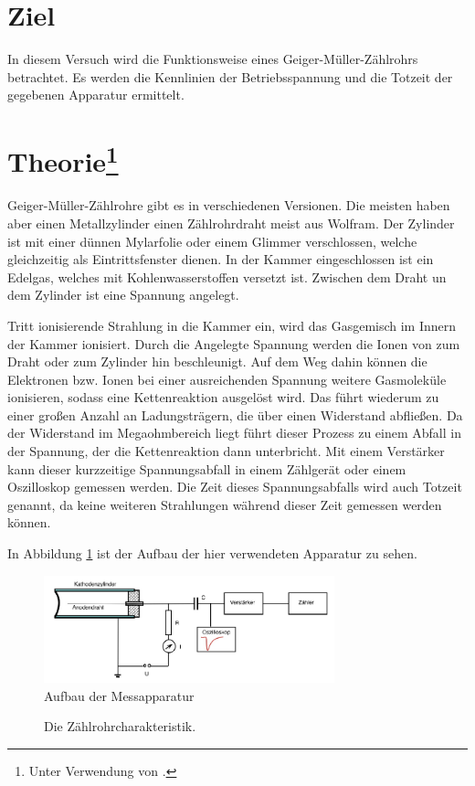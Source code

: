 \section{Ziel}
In diesem Versuch wird die Funktionsweise eines Geiger-Müller-Zählrohrs betrachtet.
Es werden die Kennlinien der Betriebsspannung und die Totzeit der gegebenen Apparatur ermittelt.

\section[Theorie]{Theorie\footnote[1]{Unter Verwendung von \cite{man:v703}.}}
Geiger-Müller-Zählrohre gibt es in verschiedenen Versionen.
Die meisten haben aber einen Metallzylinder einen Zählrohrdraht meist aus Wolfram. 
Der Zylinder ist mit einer dünnen Mylarfolie oder einem Glimmer verschlossen, welche gleichzeitig als
Eintrittsfenster dienen.
In der Kammer eingeschlossen ist ein Edelgas, welches mit Kohlenwasserstoffen versetzt ist.
Zwischen dem Draht un dem Zylinder ist eine Spannung angelegt.

Tritt ionisierende Strahlung in die Kammer ein, wird das Gasgemisch im Innern der Kammer ionisiert.
Durch die Angelegte Spannung werden die Ionen von zum Draht oder zum Zylinder hin beschleunigt.
Auf dem Weg dahin können die Elektronen bzw. Ionen bei einer ausreichenden Spannung weitere Gasmoleküle ionisieren, sodass eine Kettenreaktion ausgelöst wird.
Das führt wiederum zu einer großen Anzahl an Ladungsträgern, die über einen Widerstand abfließen.
Da der Widerstand im Megaohmbereich liegt führt dieser Prozess zu einem Abfall in der Spannung, der die Kettenreaktion dann unterbricht.
Mit einem Verstärker kann dieser kurzzeitige Spannungsabfall in einem Zählgerät oder einem Oszilloskop gemessen werden.
Die Zeit dieses Spannungsabfalls wird auch Totzeit genannt, da keine weiteren Strahlungen während dieser Zeit gemessen werden können.

In Abbildung \ref{fig:01_teo} ist der Aufbau der hier verwendeten Apparatur zu sehen.
\begin{figure}
    \centering
    \includegraphics[width = 0.75\textwidth]{14_v703/Abbildungen/Seite 2.pdf}
    \caption{Aufbau der Messapparatur \cite{man:v703}}
    \label{fig:01_teo}
\end{figure}
\begin{figure}
    \centering
    
    \caption{Die Zählrohrcharakteristik.}
\end{figure}

